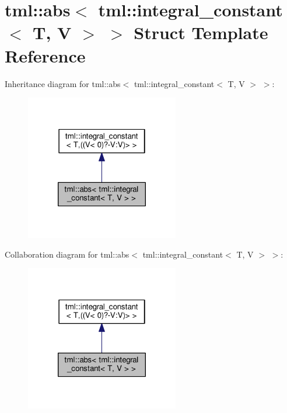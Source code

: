 \hypertarget{structtml_1_1abs_3_01tml_1_1integral__constant_3_01_t_00_01_v_01_4_01_4}{\section{tml\+:\+:abs$<$ tml\+:\+:integral\+\_\+constant$<$ T, V $>$ $>$ Struct Template Reference}
\label{structtml_1_1abs_3_01tml_1_1integral__constant_3_01_t_00_01_v_01_4_01_4}
}


Inheritance diagram for tml\+:\+:abs$<$ tml\+:\+:integral\+\_\+constant$<$ T, V $>$ $>$\+:
\nopagebreak
\begin{figure}[H]
\begin{center}
\leavevmode
\includegraphics[width=190pt]{structtml_1_1abs_3_01tml_1_1integral__constant_3_01_t_00_01_v_01_4_01_4__inherit__graph}
\end{center}
\end{figure}


Collaboration diagram for tml\+:\+:abs$<$ tml\+:\+:integral\+\_\+constant$<$ T, V $>$ $>$\+:
\nopagebreak
\begin{figure}[H]
\begin{center}
\leavevmode
\includegraphics[width=190pt]{structtml_1_1abs_3_01tml_1_1integral__constant_3_01_t_00_01_v_01_4_01_4__coll__graph}
\end{center}
\end{figure}
